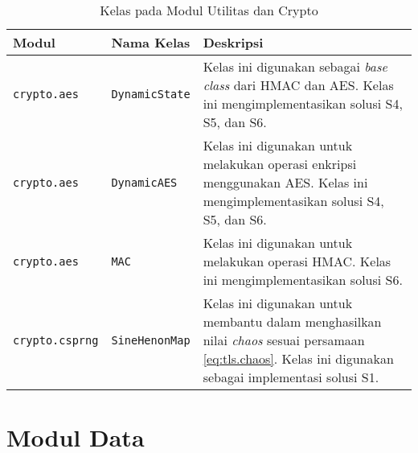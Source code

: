 \begin{table}[!h]
  \centering
  \caption{Kelas pada Modul Utilitas dan Crypto} \label{tab:impl.util.crypto}
  \begin{tabular}{|p{2.75cm}|p{3.5cm}|p{8cm}|}
    \hline
    Modul & Nama Kelas & Deskripsi \\ \hline
    \texttt{crypto.aes} & \texttt{DynamicState} & Kelas ini digunakan sebagai \emph{base class} dari HMAC dan AES. Kelas ini mengimplementasikan solusi S4, S5, dan S6.\\ \hline
    \texttt{crypto.aes} & \texttt{DynamicAES} & Kelas ini digunakan untuk melakukan operasi enkripsi menggunakan AES. Kelas ini mengimplementasikan solusi S4, S5, dan S6.\\ \hline
    \texttt{crypto.aes} & \texttt{MAC} & Kelas ini digunakan untuk melakukan operasi HMAC. Kelas ini mengimplementasikan solusi S6.\\ \hline
    \texttt{crypto.csprng} & \texttt{SineHenonMap} & Kelas ini digunakan untuk membantu dalam menghasilkan nilai \emph{chaos} sesuai persamaan \ref{eq:tls.chaos}. Kelas ini digunakan sebagai implementasi solusi S1.\\ \hline
  \end{tabular}
\end{table}

\section{Modul Data}

